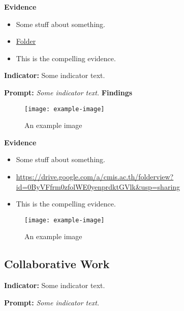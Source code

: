 \documentclass{report}
\begin{document}
\noindent\textbf{Evidence}
\vspace{-\topsep}

\begin{itemize}[leftmargin=*]
\setlength{\parskip}{0pt}
\setlength{\itemsep}{0pt plus 1pt}
\item Some stuff about something.
\item \href{https://drive.google.com/a/cmis.ac.th/folderview?id=0ByVFfrm0zfolWE0yenprdktGVlk&usp=sharing}{Folder}
\item This is the compelling evidence.
\end{itemize}

\noindent\textbf{Indicator:} Some indicator text.

\noindent\textbf{Prompt:} \textit{Some indicator text.}
\noindent\textbf{Findings}

\blindtext

\blinditemize[6]

\blindtext

\begin{figure}[h!]
\caption[An example image]{An example image}
\centering
\texttt{[image: example-image]}
\end{figure}


\noindent\textbf{Evidence}
\vspace{-\topsep}

\begin{itemize}[leftmargin=*]
\setlength{\parskip}{0pt}
\setlength{\itemsep}{0pt plus 1pt}
\item Some stuff about something.
\item \url{https://drive.google.com/a/cmis.ac.th/folderview?id=0ByVFfrm0zfolWE0yenprdktGVlk&usp=sharing}
\item This is the compelling evidence.
\end{itemize}

\begin{figure}[h!]
\caption[An example image]{An example image}
\centering
\texttt{[image: example-image]}
\end{figure}


\subsection{Collaborative Work}
\blindtext

\blindtext
 
\noindent\textbf{Indicator:} Some indicator text.

\noindent\textbf{Prompt:} \textit{Some indicator text.}
\end{document}
